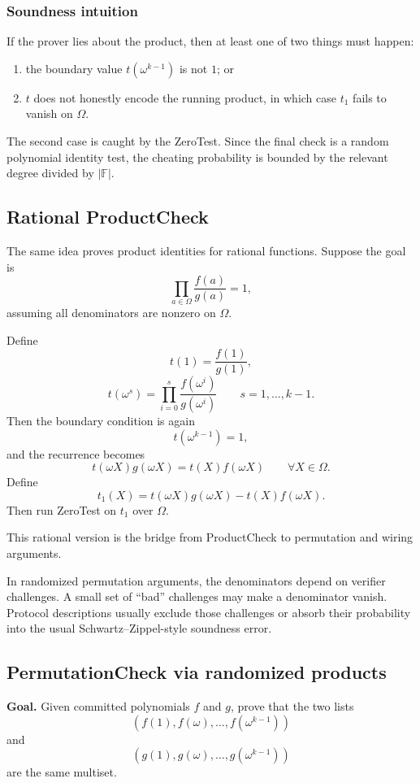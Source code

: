 \documentclass[11pt]{article}
\newcommand{\F}{\mathbb{F}}
\begin{document}
\subsubsection*{Soundness intuition}

If the prover lies about the product, then at least one of two things must happen:
\begin{enumerate}[leftmargin=2em]
    \item the boundary value $t(\omega^{k-1})$ is not $1$; or
    \item $t$ does not honestly encode the running product, in which case $t_1$ fails to vanish on $\Omega$.
\end{enumerate}
The second case is caught by the ZeroTest. Since the final check is a random polynomial identity test, the cheating probability is bounded by the relevant degree divided by $|\F|$.

\subsection{Rational ProductCheck}

The same idea proves product identities for rational functions. Suppose the goal is
\[
    \prod_{a\in\Omega}\frac{f(a)}{g(a)}=1,
\]
assuming all denominators are nonzero on $\Omega$.

Define
\[
    t(1)=\frac{f(1)}{g(1)},
\]
\[
    t(\omega^s)=\prod_{i=0}^{s}\frac{f(\omega^i)}{g(\omega^i)}
    \qquad s=1,\ldots,k-1.
\]
Then the boundary condition is again
\[
    t(\omega^{k-1})=1,
\]
and the recurrence becomes
\[
    t(\omega X)g(\omega X)=t(X)f(\omega X)
    \qquad\forall X\in\Omega.
\]
Define
\[
    t_1(X)=t(\omega X)g(\omega X)-t(X)f(\omega X).
\]
Then run ZeroTest on $t_1$ over $\Omega$.

This rational version is the bridge from ProductCheck to permutation and wiring arguments.

In randomized permutation arguments, the denominators depend on verifier challenges. A small set of ``bad'' challenges may make a denominator vanish. Protocol descriptions usually exclude those challenges or absorb their probability into the usual Schwartz--Zippel-style soundness error.

\subsection{PermutationCheck via randomized products}

\textbf{Goal.} Given committed polynomials $f$ and $g$, prove that the two lists
\[
    (f(1),f(\omega),\ldots,f(\omega^{k-1}))
\]
and
\[
    (g(1),g(\omega),\ldots,g(\omega^{k-1}))
\]
are the same multiset.
\end{document}
